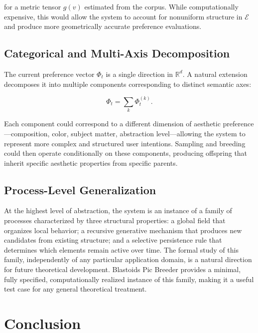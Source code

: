 \documentclass[12pt, a4paper]{article}
\theoremstyle{definition}
\begin{document}
for a metric tensor $g(v)$ estimated from the corpus. While computationally expensive, this would allow the system to account for nonuniform structure in $\mathcal{E}$ and produce more geometrically accurate preference evaluations.

\subsection{Categorical and Multi-Axis Decomposition}

The current preference vector $\Phi_t$ is a single direction in $\mathbb{R}^d$. A natural extension decomposes it into multiple components corresponding to distinct semantic axes:

\begin{equation}
\Phi_t = \sum_k \Phi_t^{(k)}.
\end{equation}

Each component could correspond to a different dimension of aesthetic preference---composition, color, subject matter, abstraction level---allowing the system to represent more complex and structured user intentions. Sampling and breeding could then operate conditionally on these components, producing offspring that inherit specific aesthetic properties from specific parents.

\subsection{Process-Level Generalization}

At the highest level of abstraction, the system is an instance of a family of processes characterized by three structural properties: a global field that organizes local behavior; a recursive generative mechanism that produces new candidates from existing structure; and a selective persistence rule that determines which elements remain active over time. The formal study of this family, independently of any particular application domain, is a natural direction for future theoretical development. Blastoids Pic Breeder provides a minimal, fully specified, computationally realized instance of this family, making it a useful test case for any general theoretical treatment.

\section{Conclusion}
\end{document}
